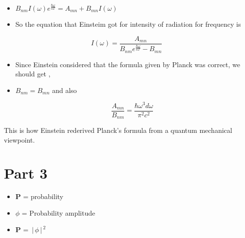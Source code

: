\documentclass[aspectratio=169]{beamer}
\begin{document}
\begin{frame}{}

	\begin{itemize}

		\item $ B_{nm} I(\omega) e^{\frac{\hbar \omega}{kT}} = A_{mn} + B_{mn} I(\omega) $ \newline
		\item So the equation that Einsteim got for intensity of radiation for frequency is 
		
	\end{itemize}
	
		\begin{equation}
				 I(\omega) = \frac{A_{mn}}{B_{nm} e^{\frac{\hbar \omega}{kT}} - B_{mn} }
		\end{equation}
		
\end{frame}

\begin{frame}{}

	\begin{itemize}

		\item Since Einstein considered that the formula given by Planck was correct, we should get , \newline
		\item  $ B_{nm} = B_{mn} $  and also
		
			\begin{flushleft} %
			
				 \[\frac{A_{mn}}{B_{nm}} = \frac{\hbar \omega^3 d\omega}{ \pi^2 c^2} \] 

			\end{flushleft}
			
	\end{itemize}
	
\end{frame}

\begin{frame}{}

	{\Large This is how Einstein rederived Planck's formula from a quantum mechanical viewpoint.}
		
\end{frame}

\section{Part 3}

\begin{frame}{}

	\begin{itemize}

		\item \textbf{P} = probability\newline
		\item $ \phi $ = Probability amplitude \newline
		\item \textbf{P} = $ \,\Bigr\rvert\,\phi \,\Bigr\rvert\,^{2} $ 
		
	\end{itemize}
	
\end{frame}
\end{document}

